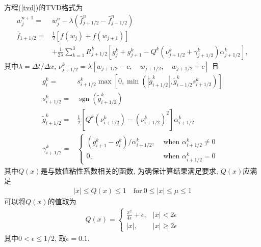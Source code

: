 \documentclass[10.5pt
]{article}
\begin{document}
方程(\ref{tvd})的TVD格式为\citep{Harten1983}
\begin{align}
w_{j}^{n+1}=&w_{j}^{n}-\lambda\left(\bar{f}_{j+1 / 2}^{n}-\bar{f}_{j-1 / 2}^{n}\right)
\\
\bar{f}_{1+1 / 2}=&
\frac{1}{2}\left[f\left(w_{j}\right)+f\left(w_{j+1}\right)\right] \nonumber
\\ &+\frac{1}{2 \lambda} \sum_{k=1}^{3} R_{j+1 / 2}^{k}\left[g_{j}^{k}+g_{j+1}^{k}-Q^{k}\left(\nu_{j+1 / 2}^{k}+\gamma_{j+1 / 2}^{k}\right) \alpha_{j+1 / 2}^{k}\right],
\end{align}
其中$\lambda=\Delta t/\Delta x$, $\nu_{j+1 / 2}^{k}=\lambda \left[w_{j+1/2}-c,\quad w_{j+1/2},\quad w_{j+1/2}+c \right]$ 且
\begin{align}
g_{i}^{k}=& s_{i+1 / 2}^{k} \max \left[0, \min \left(\left|\tilde{g}_{i+1 / 2}^{k}\right|, \tilde{g}_{i-1 / 2}^{k} s_{i+1 / 2}^{k}\right)\right] \\
s_{i+1 / 2}^{k}=&\operatorname{sgn}\left(\tilde{g}_{i+1 / 2}^{k}\right) \\ 
\tilde{g}_{i+1 / 2}^{k}=&\frac{1}{2}\left[Q^{k}\left(\nu_{i+1 / 2}^{k}\right)-\left(\nu_{i+1 / 2}^{k}\right)^{2}\right] \alpha_{i+1 / 2}^{k} \\ 
\gamma_{i+1 / 2}^{k}=&\left\{\begin{array}{ll}{\left(g_{i+1}^{k}-g_{i}^{k}\right) / \alpha_{i+1 / 2}^{k},} & {\text { when } \alpha_{i+1 / 2}^{k} \neq 0} \\ {0,} & {\text { when } \alpha_{i+1 / 2}^{k}=0}\end{array}\right.
\end{align}
其中$Q(x)$是与数值粘性系数相关的函数, 为确保计算结果满足要求, $Q(x)$应满足
\begin{align}
	|x| \leq Q(x) \leq 1 \quad \text{for}\ 0 \leq |x| \leq \mu \leq 1
\end{align}
可以将$Q(x)$的值取为
\begin{align}
Q(x)=\left\{\begin{array}{ll}{\frac{x^{2}}{4 \epsilon}+\epsilon,} & {|x|<2 \epsilon} \\ {|x|,} & {|x| \geq 2 \epsilon}\end{array}\right.
\end{align}
其中$0< \epsilon \leq 1/2$, 取$\epsilon=0.1$.
\end{document}
